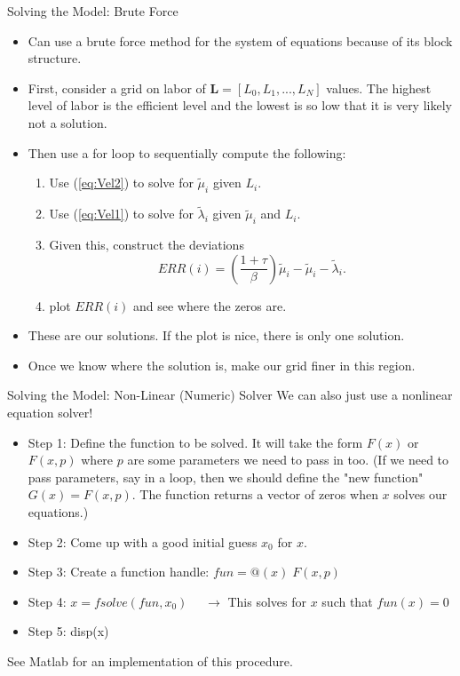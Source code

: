 \documentclass[10pt,c,aspectratio=1610,handout]{beamer}
\begin{document}
\begin{frame}{Solving the Model: Brute Force}%
  \begin{itemize}%
    \item[$\blacktriangleright$] Can use a brute force method for the system of equations because of its block structure.%
    \pause%
    \item[$\blacktriangleright$] First, consider a grid on labor of $\mathbf{L} = [L_0, L_1,...,L_N]$ values. The highest level of labor is the efficient level and the lowest is so low that it is very likely not a solution.%
    \pause%
    \item[$\blacktriangleright$] Then use a for loop to sequentially compute the following:%
      \begin{enumerate}%
        \item Use (\ref{eq:Vel2}) to solve for $\tilde \mu_i$ given $L_i$.%
        \item Use (\ref{eq:Vel1}) to solve for $\tilde \lambda_i$ given $\tilde \mu_i$ and $L_i$.%
        \item Given this, construct the deviations \[ ERR(i) =  \left( \frac{1+\tau }{\beta }\right) \tilde{\mu}_{i} - \tilde{\mu}_{i} - \tilde{\lambda}_{i}. \]%
        \item plot $ERR(i)$ and see where the zeros are.%
      \end{enumerate}%
    \item[$\blacktriangleright$] These are our solutions. If the plot is nice, there is only one solution.%
    \pause%
    \item[$\blacktriangleright$] Once we know where the solution is, make our grid finer in this region.%
  \end{itemize}%
\end{frame}%
\begin{frame}{Solving the Model: Non-Linear (Numeric) Solver}%
  We can also just use a nonlinear equation solver!%
  \begin{itemize}%
    \item[$\blacktriangleright$] Step 1: Define the function to be solved. It will take the form $F(x)$ or $F(x,p)$ where $p$ are some parameters we need to pass in too. {\scriptsize (If we need to pass parameters, say in a loop, then we should define the "new function" $G(x) = F(x,p)$. The function returns a vector of zeros when $x$ solves our equations.)}%
    \pause%
    \item[$\blacktriangleright$] Step 2: Come up with a good initial guess $x_0$ for $x$.%
    \pause%
    \item[$\blacktriangleright$] Step 3: Create a function handle: $fun = @(x) \; F(x,p)$%
    \pause%
    \item[$\blacktriangleright$] Step 4: $x = fsolve(fun,x_0)$ $\quad \rightarrow$ This solves for $x$ such that $fun(x)=0$%
    \pause%
    \item[$\blacktriangleright$] Step 5: disp(x)%
  \end{itemize}%
  See Matlab for an implementation of this procedure.%
\end{frame}%
\end{document}
